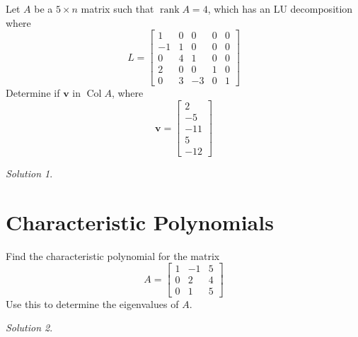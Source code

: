 \documentclass{article}
\newcommand{\vv}[1]{\mathbf{#1}}
\DeclareMathOperator{\col}{Col}
\DeclareMathOperator{\rank}{rank}
\theoremstyle{remark}
\newtheorem*{solution}{Solution}
\begin{document}
Let $A$ be a $5 \times n$ matrix such that $\rank A = 4$, which has an LU decomposition where
\begin{displaymath}
  L =
  \begin{bmatrix}
    1 & 0 & 0 & 0 & 0 \\
    -1 & 1 & 0 & 0 & 0\\
    0 & 4 & 1 & 0 & 0\\
    2 & 0 & 0 & 1 & 0 \\
    0 & 3 & -3 & 0 & 1
  \end{bmatrix}
\end{displaymath}
Determine if $\vv v$ in $\col A$, where
\begin{displaymath}
  \vv v =
  \begin{bmatrix}
    2 \\ -5 \\ -11 \\ 5 \\ -12
  \end{bmatrix}
\end{displaymath}

\begin{solution}
\end{solution}

\pagebreak
\section{Characteristic Polynomials}

Find the characteristic polynomial for the matrix
\begin{displaymath}
  A =
  \begin{bmatrix}
    1 & -1 & 5 \\
    0 & 2 & 4 \\
    0 & 1 & 5
  \end{bmatrix}
\end{displaymath}
Use this to determine the eigenvalues of $A$.

\begin{solution}
\end{solution}
\end{document}
